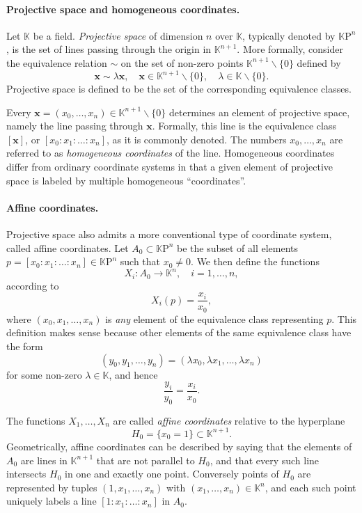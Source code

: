 \documentclass[12pt]{article}
\newcommand{\kf}{\mathbb{K}}
\newcommand{\KP}{{\mathbb{K}\mathrm{P}}}
\newcommand{\bx}{\mathbf{x}}
\newcommand{\nzkn}{\kf^{n+1}\backslash \{0\}}
\begin{document}
\paragraph{Projective space and homogeneous coordinates.}
Let $\kf$ be a field.  {\em Projective space} of dimension $n$ over
$\kf$, typically denoted by $\KP^n$, is the set of lines passing
through the origin in $\kf^{n+1}$.  More formally, consider the
equivalence relation $\sim$ on the set of non-zero points $\nzkn$
defined by
$$\bx \sim \lambda \bx,\quad \bx\in \nzkn,\quad \lambda \in
\kf\backslash\{0\}.$$
Projective space is defined to be the set of the
corresponding equivalence classes.

Every $\bx=(x_0,\ldots,x_n)\in\nzkn$ determines an element of
projective space, namely the line passing through $\bx$. Formally,
this line is the equivalence class $[\bx]$, or $[x_0:x_1:\ldots:x_n]$,
as it is commonly denoted. The numbers $x_0,\ldots,x_n$ are referred
to as \emph{homogeneous coordinates} of the line.  Homogeneous coordinates
differ from ordinary coordinate systems in that a given element of
projective space is labeled by multiple homogeneous ``coordinates''.

\paragraph{Affine coordinates.} Projective space also admits a more
conventional type of coordinate system, called affine coordinates.
Let $A_0\subset\KP^n$ be the subset of all elements
$p=[x_0:x_1:\ldots:x_n]\in\KP^n$ such that $x_0\neq 0$.  We then
define the functions
$$X_i:A_0\rightarrow \kf^n,\quad i=1,\ldots,n,$$
according to
$$X_i(p) = \frac{x_i}{x_0},$$
where $(x_0,x_1,\ldots,x_n)$ is {\em
  any} element of the equivalence class representing $p$. This
definition makes sense because other elements of the same equivalence
class have the form
$$(y_0,y_1,\ldots,y_n)=(\lambda x_0,\lambda x_1,\ldots,\lambda x_n)$$
for some non-zero $\lambda\in\kf$, and hence 
$$\frac{y_i}{y_0} = \frac{x_i}{x_0}.$$

The functions $X_1,\ldots,X_n$ are called \emph{affine coordinates} relative
to the hyperplane $$H_0=\{x_0=1\}\subset\kf^{n+1}.$$
Geometrically,
affine coordinates can be described by saying that the elements of
$A_0$ are lines in $\kf^{n+1}$ that are not parallel to $H_0$, and
that every such line intersects $H_0$ in one and exactly one point.
Conversely points of $H_0$ are represented by tuples
$(1,x_1,\ldots,x_n)$ with $(x_1,\ldots,x_n)\in\kf^n$, and each such
point uniquely labels a line $[1:x_1:\ldots:x_n]$ in $A_0$.  
\end{document}
